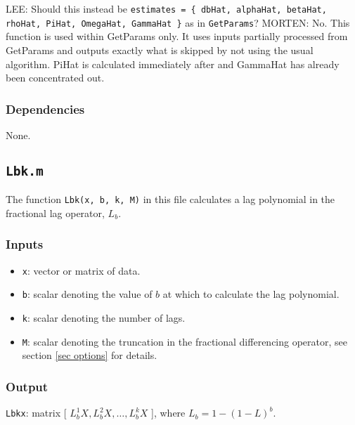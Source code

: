 \documentclass[12pt]{article}
\begin{document}
LEE: Should this instead be \texttt{estimates = \{ dbHat, alphaHat, betaHat, rhoHat, PiHat, OmegaHat, GammaHat \}} as in \texttt{GetParams}?
MORTEN: No. This function is used within GetParams only. It uses inputs partially processed from GetParams and outputs exactly what is skipped by not using the usual algorithm. PiHat is calculated immediately after and GammaHat has already been concentrated out.

\subsubsection*{Dependencies}

None.






\newpage


\subsection{\texttt{Lbk.m}}

The function \texttt{Lbk(x, b, k, M)} in this file calculates a lag polynomial in the fractional lag operator, $L_b$.

\subsubsection*{Inputs}

\begin{itemize}

\item \texttt{x}: vector or matrix of data.

\item \texttt{b}: scalar denoting the value of $b$ at which to calculate the lag polynomial.

\item \texttt{k}: scalar denoting the number of lags.

\item \texttt{M}: scalar denoting the truncation in the fractional differencing operator, see section \ref{sec options} for details.

\end{itemize}


\subsubsection*{Output}

\texttt{Lbkx}: matrix  [ $L_b^1 X, L_b^2 X, \ldots , L_b^k X$ ], where $L_b = 1 - (1-L)^b$.
\end{document}
